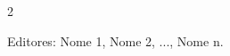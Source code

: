 \documentclass[11pt,a4paper]{article}
\begin{document}
\sloppy

\newcommand{\edicaoMes}{MÊS}
\newcommand{\edicaoAno}{ANO}





\begin{multicols}{2}


%
%




{\color{gray}
Editores:
Nome 1, Nome 2, ..., Nome n.
}

\end{multicols}
\end{document}
